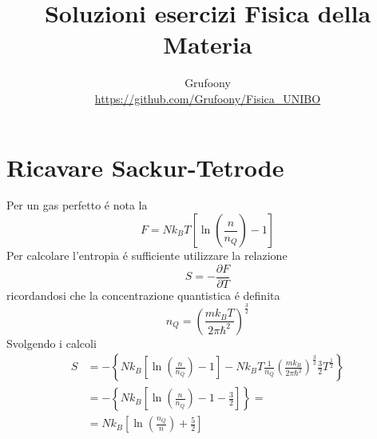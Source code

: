 \documentclass[a4paper]{article}
\begin{document}
	\title{Soluzioni esercizi Fisica della Materia}
	\author{Grufoony\\\url{https://github.com/Grufoony/Fisica_UNIBO}}
	\maketitle

    \section*{Ricavare Sackur-Tetrode}
        Per un gas perfetto \'e nota la
        \begin{equation*}
            F=Nk_BT\left[\ln\left(\frac{n}{n_Q}\right)-1\right]
        \end{equation*}
        Per calcolare l'entropia \'e sufficiente utilizzare la relazione
        \begin{equation*}
            S=-\frac{\partial F}{\partial T}
        \end{equation*}
        ricordandosi che la concentrazione quantistica \'e definita
        \begin{equation*}
            n_Q=\left(\frac{mk_BT}{2\pi\hbar^2}\right)^{\frac{3}{2}}
        \end{equation*}
        Svolgendo i calcoli
        \begin{equation*}
            \begin{split}
                S&=-\left\{Nk_B\left[\ln\left(\frac{n}{n_Q}\right)-1\right]-Nk_BT\frac{1}{n_Q}\left(\frac{mk_B}{2\pi\hbar^2}\right)^{\frac{3}{2}}\frac{3}{2}T^{\frac{1}{2}}\right\}\\
                &=-\left\{Nk_B\left[\ln\left(\frac{n}{n_Q}\right)-1-\frac{3}{2}\right]\right\}=\\
                &=Nk_B\left[\ln\left(\frac{n_Q}{n}\right)+\frac{5}{2}\right]
            \end{split}
        \end{equation*}
        \begin{center}
        \end{center}
\end{document}
